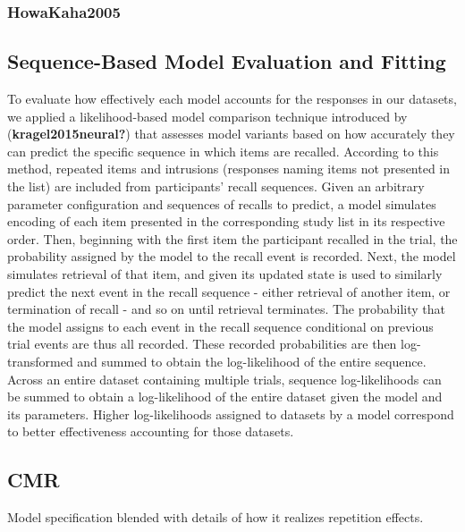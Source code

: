 \documentclass[
  letterpaper,
  DIV=11]{article}
\begin{document}
\hypertarget{howakaha2005}{%
\subsubsection{HowaKaha2005}\label{howakaha2005}}

\hypertarget{sequence-based-model-evaluation-and-fitting}{%
\subsection{Sequence-Based Model Evaluation and
Fitting}\label{sequence-based-model-evaluation-and-fitting}}

To evaluate how effectively each model accounts for the responses in our
datasets, we applied a likelihood-based model comparison technique
introduced by (\textbf{kragel2015neural?}) that assesses model variants
based on how accurately they can predict the specific sequence in which
items are recalled. According to this method, repeated items and
intrusions (responses naming items not presented in the list) are
included from participants' recall sequences. Given an arbitrary
parameter configuration and sequences of recalls to predict, a model
simulates encoding of each item presented in the corresponding study
list in its respective order. Then, beginning with the first item the
participant recalled in the trial, the probability assigned by the model
to the recall event is recorded. Next, the model simulates retrieval of
that item, and given its updated state is used to similarly predict the
next event in the recall sequence - either retrieval of another item, or
termination of recall - and so on until retrieval terminates. The
probability that the model assigns to each event in the recall sequence
conditional on previous trial events are thus all recorded. These
recorded probabilities are then log-transformed and summed to obtain the
log-likelihood of the entire sequence. Across an entire dataset
containing multiple trials, sequence log-likelihoods can be summed to
obtain a log-likelihood of the entire dataset given the model and its
parameters. Higher log-likelihoods assigned to datasets by a model
correspond to better effectiveness accounting for those datasets.

\hypertarget{cmr}{%
\subsection{CMR}\label{cmr}}

Model specification blended with details of how it realizes repetition
effects.
\end{document}
